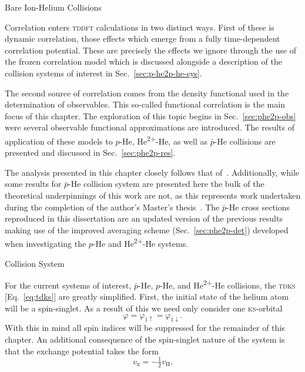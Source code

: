 \documentclass[a5paper, 9 pt]{extreport}
\begin{document}
\begin{chapter}{Bare Ion-Helium Collisions \label{chap:p-he2p-he}}

   Correlation enters \textsc{tddft} calculations in two distinct ways. First of these is dynamic
   correlation, those effects which emerge from a fully time-dependent correlation potential. These are
   precisely the effects we ignore through the use of the frozen correlation model which is discussed
   alongside a description of the collision systems of interest in Sec.~\ref{sec:p-he2p-he-sys}.

   The second source of correlation comes from the density functional
   used in the determination of observables. This so-called functional correlation is the main focus of
   this chapter. The exploration of this topic begins in Sec.~\ref{sec:phe2p-obs} were several
   observable functional approximations are introduced. The results of application of these models to
   $p$-He, He\textsuperscript{2+}-He, as well as $\bar{p}$-He collisions are presented and discussed in
   Sec.~\ref{sec:phe2p-res}.

   The analysis presented in this chapter closely follows that of~\cite{p-he2p-he}. Additionally, while
   some results for $\bar{p}$-He collision system are presented here the bulk of the theoretical
   underpinnings of this work are not, as this represents work undertaken during the completion of the
   author's Master's thesis~\cite{thesis}. The $\bar{p}$-He cross sections reproduced in this
   dissertation are an updated version of the previous results making use of the improved averaging
   scheme (Sec.~\ref{sec:phe2p-det}) developed when investigating the $p$-He and
   He\textsuperscript{2+}-He systems.

   \begin{section}{Collision System \label{sec:p-he2p-he-sys}}

      For the current systems of interest, $\bar{p}$-He, $p$-He, and He\textsuperscript{2+}-He
      collisions, the \textsc{tdks} [Eq.~\eqref{eq:tdks}] are greatly simplified. First, the initial
      state of the helium atom will be a spin-singlet. As a result of this we need only consider one
      \textsc{ks}-orbital
      \begin{equation} \label{eq:oneorb}
         \varphi = \varphi_{1\uparrow} = \varphi_{1\downarrow}.
      \end{equation}
      With this in mind all spin indices will be suppressed for the remainder of this chapter. An
      additional consequence of the spin-singlet nature of the system is that the exchange potential
      takes the form
      \begin{equation} \label{eq:vxvh}
         v_\mathrm{x} = - \tfrac{1}{2} v_\mathrm{H}.
      \end{equation}


\end{section}
\end{chapter}
\end{document}
